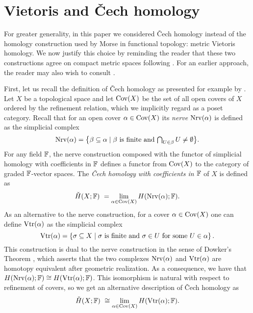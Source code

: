 
\section{Vietoris and \texorpdfstring{\v{C}}{}ech homology} \label{s:vietoris}

For greater generality, in this paper we considered \v{C}ech homology instead of the homology construction used by Morse in functional topology: metric Vietoris homology.
We now justify this choice by reminding the reader that these two constructions agree on compact metric spaces following \cite{Dowker.1952}. For an earlier approach, the reader may also wish to consult \cite[Section VII.6]{Lefschetz.1942}.

First, let us recall the definition of \v{C}ech homology as presented for example by \cite[Section~IX--X]{Eilenberg.1952}.
Let $X$ be a topological space and let $\operatorname{Cov}(X)$ be the set of all open covers of $X$ ordered by the refinement relation, which we implicitly regard as a poset category.
Recall that for an open cover $\alpha \in \operatorname{Cov}(X)$ its \emph{nerve} $\operatorname{Nrv}(\alpha)$ is defined as the simplicial complex
\begin{equation*}
\operatorname{Nrv}(\alpha) =
\big\{ \beta \subseteq \alpha \mid \beta \text{ is finite and } \textstyle{\bigcap_{U \in \beta}} \, U \neq \emptyset \big\}.
\end{equation*}
For any field $\mathbb{F}$, the nerve construction composed with the functor of simplicial homology with coefficients in $\mathbb{F}$ defines a functor from $\operatorname{Cov}(X)$ to the category of graded $\mathbb{F}$-vector spaces.
The \emph{\v{C}ech homology with coefficients in $\mathbb{F}$} of $X$ is defined as
\begin{equation*}
\check{H}(X; \mathbb{F}) \ =
\lim_{\alpha \in \operatorname{Cov}(X)} H(\operatorname{Nrv}(\alpha); \mathbb{F}).
\end{equation*}
As an alternative to the nerve construction, for a cover $\alpha \in \operatorname{Cov}(X)$ one can define $\operatorname{Vtr}(\alpha)$ as the simplicial complex
\begin{equation*}
\operatorname{Vtr} (\alpha) = \left\{ \sigma \subseteq X \mid \sigma \text{ is finite and } \sigma \in U \text{ for some } U \in \alpha \right\}.
\end{equation*}
This construction is dual to the nerve construction in the sense of Dowker's Theorem \cite{Dowker.1952}, which asserts that the two complexes $\operatorname{Nrv} (\alpha)$ and $\operatorname{Vtr} (\alpha)$ are homotopy equivalent after geometric realization.
As a consequence, we have that $H (\operatorname{Nrv} (\alpha); \mathbb{F}) \cong H (\operatorname{Vtr} (\alpha); \mathbb{F})$.
This isomorphism is natural with respect to refinement of covers, so we get an alternative description of \v{C}ech homology as
\begin{equation*}
\check{H} (X; \mathbb{F}) \ \cong
\lim_{\alpha \in \operatorname{Cov} (X)} H (\operatorname{Vtr} (\alpha); \mathbb{F}).
\end{equation*}


